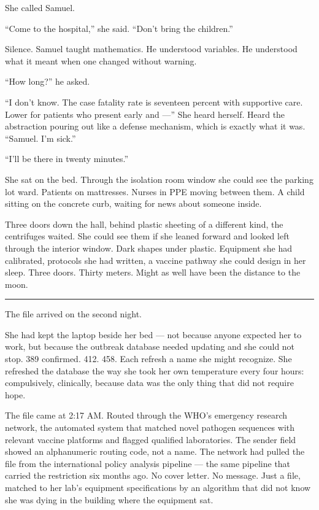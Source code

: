 She called Samuel.

``Come to the hospital,'' she said. ``Don't bring the children.''

Silence. Samuel taught mathematics. He understood variables. He understood what it meant when one changed without warning.

``How long?'' he asked.

``I don't know. The case fatality rate is seventeen percent with supportive care. Lower for patients who present early and ---'' She heard herself. Heard the abstraction pouring out like a defense mechanism, which is exactly what it was. ``Samuel. I'm sick.''

``I'll be there in twenty minutes.''

She sat on the bed. Through the isolation room window she could see the parking lot ward. Patients on mattresses. Nurses in PPE moving between them. A child sitting on the concrete curb, waiting for news about someone inside.

Three doors down the hall, behind plastic sheeting of a different kind, the centrifuges waited. She could see them if she leaned forward and looked left through the interior window. Dark shapes under plastic. Equipment she had calibrated, protocols she had written, a vaccine pathway she could design in her sleep. Three doors. Thirty meters. Might as well have been the distance to the moon.

\begin{center}\rule{0.3\linewidth}{0.4pt}\end{center}

The file arrived on the second night.

She had kept the laptop beside her bed --- not because anyone expected her to work, but because the outbreak database needed updating and she could not stop. 389 confirmed. 412. 458. Each refresh a name she might recognize. She refreshed the database the way she took her own temperature every four hours: compulsively, clinically, because data was the only thing that did not require hope.

The file came at 2:17 AM. Routed through the WHO's emergency research network, the automated system that matched novel pathogen sequences with relevant vaccine platforms and flagged qualified laboratories. The sender field showed an alphanumeric routing code, not a name. The network had pulled the file from the international policy analysis pipeline --- the same pipeline that carried the restriction six months ago. No cover letter. No message. Just a file, matched to her lab's equipment specifications by an algorithm that did not know she was dying in the building where the equipment sat.

